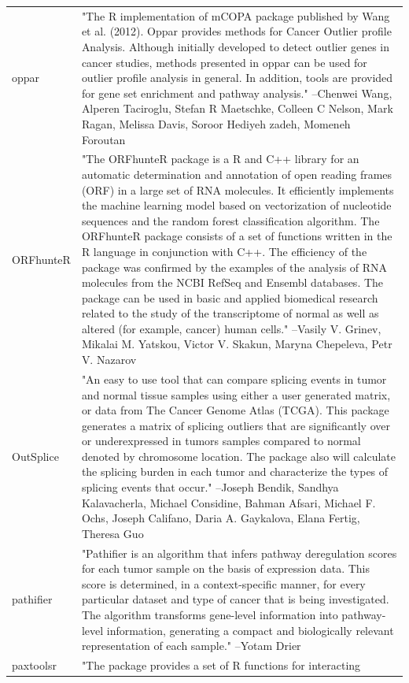 \begin{longtable}[t]{l>{\raggedright\arraybackslash}p{25em}}
oppar & "The R implementation of mCOPA package published by Wang et
al. (2012). Oppar provides methods for Cancer Outlier profile
Analysis. Although initially developed to detect outlier genes
in cancer studies, methods presented in oppar can be used for
outlier profile analysis in general. In addition, tools are
provided for gene set enrichment and pathway analysis." --Chenwei Wang, Alperen Taciroglu, Stefan R Maetschke, Colleen C Nelson, Mark Ragan, Melissa Davis, Soroor Hediyeh zadeh, Momeneh Foroutan\\
ORFhunteR & "The ORFhunteR package is a R and C++ library for an
automatic determination and annotation of open reading frames
(ORF) in a large set of RNA molecules. It efficiently
implements the machine learning model based on vectorization of
nucleotide sequences and the random forest classification
algorithm. The ORFhunteR package consists of a set of functions
written in the R language in conjunction with C++. The
efficiency of the package was confirmed by the examples of the
analysis of RNA molecules from the NCBI RefSeq and Ensembl
databases. The package can be used in basic and applied
biomedical research related to the study of the transcriptome
of normal as well as altered (for example, cancer) human cells." --Vasily V. Grinev, Mikalai M. Yatskou, Victor V. Skakun, Maryna Chepeleva, Petr V. Nazarov\\
OutSplice & "An easy to use tool that can compare splicing events in
tumor and normal tissue samples using either a user generated
matrix, or data from The Cancer Genome Atlas (TCGA). This
package generates a matrix of splicing outliers that are
significantly over or underexpressed in tumors samples compared
to normal denoted by chromosome location. The package also will
calculate the splicing burden in each tumor and characterize
the types of splicing events that occur." --Joseph Bendik, Sandhya Kalavacherla, Michael Considine, Bahman Afsari, Michael F. Ochs, Joseph Califano, Daria A. Gaykalova, Elana Fertig, Theresa Guo\\
\addlinespace
pathifier & "Pathifier is an algorithm that infers pathway deregulation
scores for each tumor sample on the basis of expression data.
This score is determined, in a context-specific manner, for
every particular dataset and type of cancer that is being
investigated. The algorithm transforms gene-level information
into pathway-level information, generating a compact and
biologically relevant representation of each sample." --Yotam Drier\\
paxtoolsr & "The package provides a set of R functions for interacting

\end{longtable}
